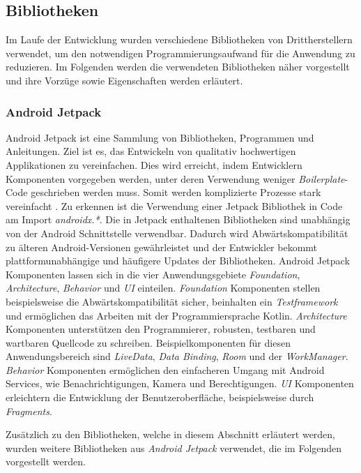 \documentclass[a4paper]{article}
\begin{document}
\subsection{Bibliotheken}
\label{subsec:technologies:bibs}
Im Laufe der Entwicklung wurden verschiedene Bibliotheken von Drittherstellern verwendet, um den notwendigen Programmierungsaufwand für die Anwendung zu reduzieren.
Im Folgenden werden die verwendeten Bibliotheken näher vorgestellt und ihre Vorzüge sowie Eigenschaften werden erläutert.


\subsubsection{Android Jetpack}
\label{subsubsec:technologies:bibs:jetpack}
Android Jetpack ist eine Sammlung von Bibliotheken, Programmen und Anleitungen.
Ziel ist es, das Entwickeln von qualitativ hochwertigen Applikationen zu vereinfachen.
Dies wird erreicht, indem Entwicklern Komponenten vorgegeben werden, unter deren Verwendung weniger \textit{Boilerplate}-Code geschrieben werden muss.
Somit werden komplizierte Prozesse stark vereinfacht \autocite{android_jetpack}.
Zu erkennen ist die Verwendung einer Jetpack Bibliothek in Code am Import \textit{androidx.*}.
Die in Jetpack enthaltenen Bibliotheken sind unabhängig von der Android Schnittstelle verwendbar.
Dadurch wird Abwärtskompatibilität zu älteren Android-Versionen gewährleistet und der Entwickler bekommt plattformunabhängige und häufigere Updates der Bibliotheken.
Android Jetpack Komponenten lassen sich in die vier Anwendungsgebiete \textit{Foundation}, \textit{Architecture}, \textit{Behavior} und \textit{UI} einteilen.
\textit{Foundation} Komponenten stellen beispielsweise die Abwärtskompatibilität sicher, beinhalten ein \textit{Testframework} und ermöglichen das Arbeiten mit der Programmiersprache Kotlin.
\textit{Architecture} Komponenten unterstützen den Programmierer, robusten, testbaren und wartbaren Quellcode zu schreiben.
Beispielkomponenten für diesen Anwendungsbereich sind \textit{LiveData}, \textit{Data Binding}, \textit{Room} und der \textit{WorkManager}.
\textit{Behavior} Komponenten ermöglichen den einfacheren Umgang mit Android Services, wie Benachrichtigungen, Kamera und Berechtigungen.
\textit{UI} Komponenten erleichtern die Entwicklung der Benutzeroberfläche, beispielsweise durch \textit{Fragments}.

Zusätzlich zu den Bibliotheken, welche in diesem Abschnitt erläutert werden, wurden weitere Bibliotheken aus \textit{Android Jetpack} verwendet, die im Folgenden vorgestellt werden.
\end{document}
